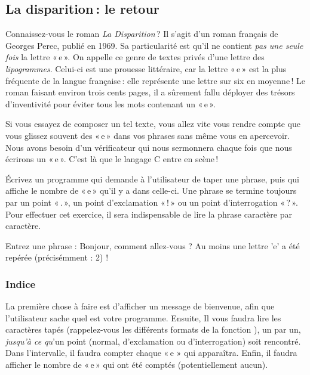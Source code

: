 \subsection{La disparition : le retour}
\label{la-disparition-le-retour}

Connaissez-vous le roman \emph{La Disparition} ? Il s'agit d'un roman
français de Georges Perec, publié en 1969. Sa particularité est qu'il ne
contient \emph{pas une seule fois} la lettre « e ». On appelle ce genre
de textes privés d'une lettre des \emph{lipogrammes}. Celui-ci est une
prouesse littéraire, car la lettre « e » est la plus fréquente de la
langue française : elle représente une lettre sur six en moyenne ! Le
roman faisant environ trois cents pages, il a sûrement fallu déployer
des trésors d'inventivité pour éviter tous les mots contenant un « e ».

Si vous essayez de composer un tel texte, vous allez vite vous rendre
compte que vous glissez souvent des « e » dans vos phrases sans même
vous en apercevoir. Nous avons besoin d'un vérificateur qui nous
sermonnera chaque fois que nous écrirons un « e ». C'est là que le
langage C entre en scène !

Écrivez un programme qui demande à l'utilisateur de taper une phrase,
puis qui affiche le nombre de « e » qu'il y a dans celle-ci. Une phrase
se termine toujours par un point « . », un point d'exclamation « ! » ou
un point d'interrogation « ? ». Pour effectuer cet exercice, il sera
indispensable de lire la phrase caractère par caractère.

\begin{C}
Entrez une phrase : Bonjour, comment allez-vous ?
Au moins une lettre 'e' a été repérée (précisémment : 2) !
\end{C}

\subsubsection*{Indice}
\label{indice-4}

\begin{secretbox}
  La première chose à faire est d'afficher
un message de bienvenue, afin que l'utilisateur sache quel est votre
programme. Ensuite, Il vous faudra lire les caractères tapés
(rappelez-vous les différents formats de la fonction ),
un par un, \emph{jusqu'à ce qu}'un point (normal, d'exclamation ou
d'interrogation) soit rencontré. Dans l'intervalle, il faudra compter
chaque « e » qui apparaîtra. Enfin, il faudra afficher le nombre de
« e » qui ont été comptés (potentiellement aucun).
\end{secretbox}



